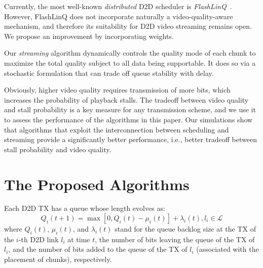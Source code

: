 \documentclass[journal]{IEEEtran}
\begin{document}
Currently, the most well-known \textit{distributed} D2D scheduler is \textit{FlashLinQ}~\cite{ton2013wu}.
However, FlashLinQ does not incorporate naturally a video-quality-aware mechanism, and therefore its suitability for D2D video streaming remains open.
We propose an improvement by incorporating weights.

Our \textit{streaming} algorithm dynamically controls the quality mode of each chunk to maximize the total quality subject to
    all data being supportable. It does so via a stochastic formulation that can trade off queue stability with delay.

Obviously, higher video quality requires transmission of more bits, which  increases the probability of playback stalls. The tradeoff between video quality and stall probability is a key measure for any transmission scheme, and we use it to assess the performance of the algorithms in this paper. Our simulations show that algorithms that exploit the interconnection between scheduling and streaming provide a significantly better performance, i.e., better tradeoff between stall probability and video quality.




\section{The Proposed Algorithms}
Each D2D TX has a queue whose length evolves as:
\begin{equation}
Q_{i}(t+1) = \max\left[0, Q_{i}(t) - \mu_{i}(t)\right] + \lambda_{i}(t), l_{i}\in\mathcal{L}
\label{eq:q}
\end{equation}
where $Q_{i}(t)$, $\mu_{i}(t)$, and $\lambda_{i}(t)$ stand for
    the queue backlog size at the TX of the $i$-th D2D link $l_{i}$ at time $t$,
    the number of bits leaving the queue of the TX of $l_{i}$,
    and the number of bits added to the queue of the TX of $l_{i}$ (associated with the placement of chunks), respectively.
\end{document}
